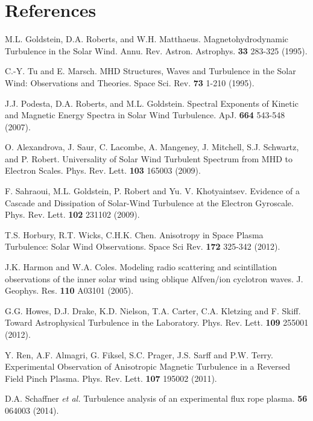 \documentclass[aip,prl,amsmath,amssymb,reprint,superscriptaddress]{revtex4-1} %
\begin{document}
\section*{References}
\begin{thebibliography}{99}

 M.L. Goldstein, D.A. Roberts, and W.H. Matthaeus. Magnetohydrodynamic Turbulence in the Solar Wind. Annu. Rev. Astron. Astrophys. {\bf 33} 283-325 (1995).

 C.-Y. Tu and E. Marsch. MHD Structures, Waves and Turbulence in the Solar Wind: Observations and Theories. Space Sci. Rev. {\bf 73} 1-210 (1995).

 J.J. Podesta, D.A. Roberts, and M.L. Goldstein. Spectral Exponents of Kinetic and Magnetic Energy Spectra in Solar Wind Turbulence. ApJ. {\bf 664} 543-548 (2007).

 O. Alexandrova, J. Saur, C. Lacombe, A. Mangeney, J. Mitchell, S.J. Schwartz, and P. Robert. Universality of Solar Wind Turbulent Spectrum from MHD to Electron Scales. Phys. Rev. Lett. {\bf 103} 165003 (2009).

 F. Sahraoui, M.L. Goldstein, P. Robert and Yu. V. Khotyaintsev. Evidence of a Cascade and Dissipation of Solar-Wind Turbulence at the Electron Gyroscale. Phys. Rev. Lett. {\bf 102} 231102 (2009).

 T.S. Horbury, R.T. Wicks, C.H.K. Chen. Anisotropy in Space Plasma Turbulence: Solar Wind Observations. Space Sci Rev. {\bf 172} 325-342 (2012).

 J.K. Harmon and W.A. Coles. Modeling radio scattering and scintillation observations of the inner solar wind using oblique Alfven/ion cyclotron waves. J. Geophys. Res. {\bf 110} A03101 (2005).

 G.G. Howes, D.J. Drake, K.D. Nielson, T.A. Carter, C.A. Kletzing and F. Skiff. Toward Astrophysical Turbulence in the Laboratory. Phys. Rev. Lett. {\bf 109} 255001 (2012).

 Y. Ren, A.F. Almagri, G. Fiksel, S.C. Prager, J.S. Sarff and P.W. Terry. Experimental Observation of Anisotropic Magnetic Turbulence in a Reversed Field Pinch Plasma. Phys. Rev. Lett. {\bf 107} 195002 (2011).

 D.A. Schaffner {\it et al.} Turbulence analysis of an experimental flux rope plasma. {\bf 56} 064003 (2014).


\end{thebibliography}
\end{document}
